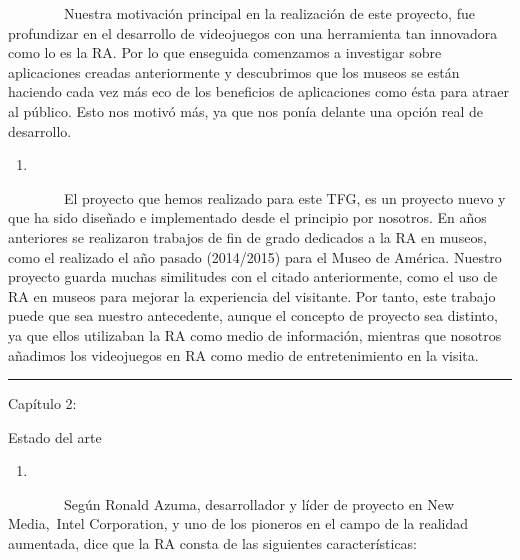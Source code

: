 ~~~~~~~~Nuestra motivación principal en la realización de este proyecto,
fue profundizar en el desarrollo de videojuegos con una herramienta tan
innovadora como lo es la RA. Por lo que enseguida comenzamos a
investigar sobre aplicaciones creadas anteriormente y descubrimos que
los museos se están haciendo cada vez más eco de los beneficios de
aplicaciones como ésta para atraer al público. Esto nos motivó más, ya
que nos ponía delante una opción real de desarrollo.

\begin{enumerate}
\def\labelenumi{\arabic{enumi}.}
\setcounter{enumi}{3}
\item
\end{enumerate}

~~~~~~~~El proyecto que hemos realizado para este TFG, es un proyecto
nuevo y que ha sido diseñado e implementado desde el principio por
nosotros. En años anteriores se realizaron trabajos de fin de grado
dedicados a la RA en museos, como el realizado el año pasado (2014/2015)
para el Museo de América. Nuestro proyecto guarda muchas similitudes con
el citado anteriormente, como el uso de RA en museos para mejorar la
experiencia del visitante. Por tanto, este trabajo puede que sea nuestro
antecedente, aunque el concepto de proyecto sea distinto, ya que ellos
utilizaban la RA como medio de información, mientras que nosotros
añadimos los videojuegos en RA como medio de entretenimiento en la
visita.

\begin{center}\rule{3in}{0.4pt}\end{center}

Capítulo 2:

Estado del arte

\begin{enumerate}
\def\labelenumi{\arabic{enumi}.}
\item
\end{enumerate}

~~~~~~~~Según Ronald Azuma, desarrollador y líder de proyecto en New
Media,~Intel Corporation, y uno de los pioneros en el campo de la
realidad aumentada, dice que la RA consta de las siguientes
características:

